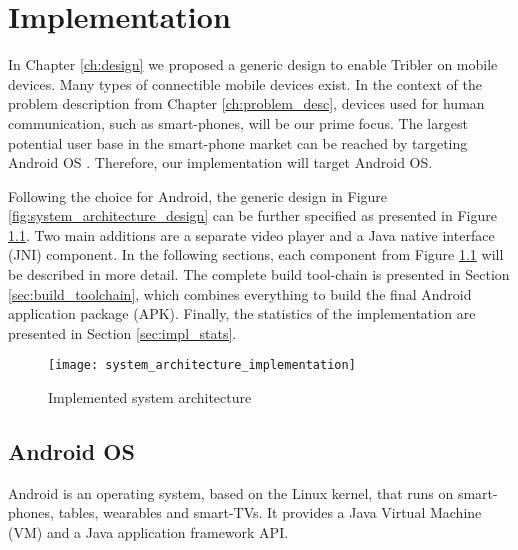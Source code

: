 \chapter{Implementation}
\label{ch:implementation}

In Chapter \ref{ch:design} we proposed a generic design to enable Tribler on mobile devices.
Many types of connectible mobile devices exist.
In the context of the problem description from Chapter \ref{ch:problem_desc}, devices used for human communication, such as smart-phones, will be our prime focus.
The largest potential user base in the smart-phone market can be reached by targeting Android OS \cite{smartphone-os}.
Therefore, our implementation will target Android OS.

Following the choice for Android, the generic design in Figure \ref{fig:system_architecture_design} can be further specified as presented in Figure \ref{fig:system_architecture_implementation}.
Two main additions are a separate video player and a Java native interface (JNI) component.
In the following sections, each component from Figure \ref{fig:system_architecture_implementation} will be described in more detail.
The complete build tool-chain is presented in Section \ref{sec:build_toolchain}, which combines everything to build the final Android application package (APK).
Finally, the statistics of the implementation are presented in Section \ref{sec:impl_stats}.

\begin{figure}[H]
	\centering
	\texttt{[image: system\_architecture\_implementation]}
	\caption{Implemented system architecture}
	\label{fig:system_architecture_implementation}
\end{figure}


\section{Android OS}
Android is an operating system, based on the Linux kernel, that runs on smart-phones, tables, wearables and smart-TVs.
It provides a Java Virtual Machine (VM) and a Java application framework API.

